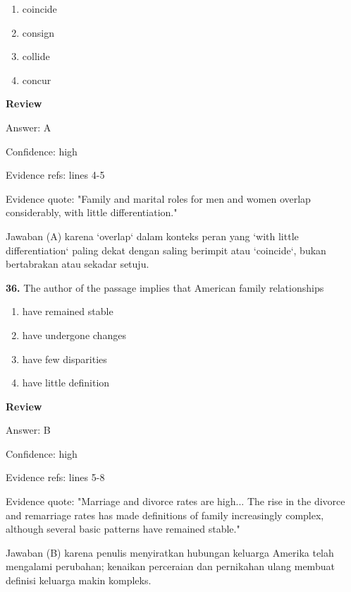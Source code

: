 \documentclass[12pt]{article}
\begin{document}
\begin{enumerate}[label=(\Alph*),leftmargin=*,itemsep=0.2em]
\item coincide
\item consign
\item collide
\item concur
\end{enumerate}
\par
\begingroup
\setlength{\parskip}{0pt}
\setlength{\parindent}{0pt}
\textbf{Review}\par
Answer: A\par
Confidence: high\par
Evidence refs: lines 4-5\par
Evidence quote: "Family and marital roles for men and women overlap considerably, with little differentiation."\par
Jawaban (A) karena `overlap` dalam konteks peran yang `with little differentiation` paling dekat dengan saling berimpit atau `coincide`, bukan bertabrakan atau sekadar setuju.\par
\endgroup
\par
\vspace{0.25\baselineskip}
\noindent\textbf{36.} The author of the passage implies that American family relationships
\begin{enumerate}[label=(\Alph*),leftmargin=*,itemsep=0.2em]
\item have remained stable
\item have undergone changes
\item have few disparities
\item have little definition
\end{enumerate}
\par
\begingroup
\setlength{\parskip}{0pt}
\setlength{\parindent}{0pt}
\textbf{Review}\par
Answer: B\par
Confidence: high\par
Evidence refs: lines 5-8\par
Evidence quote: "Marriage and divorce rates are high... The rise in the divorce and remarriage rates has made definitions of family increasingly complex, although several basic patterns have remained stable."\par
Jawaban (B) karena penulis menyiratkan hubungan keluarga Amerika telah mengalami perubahan; kenaikan perceraian dan pernikahan ulang membuat definisi keluarga makin kompleks.\par
\endgroup
\par
\end{document}
